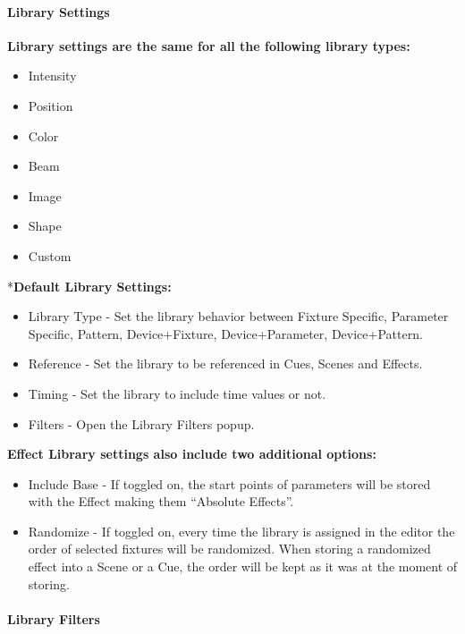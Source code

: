 \documentclass[
]{article}
\begin{document}
\hypertarget{library-settings}{%
\paragraph{Library Settings}\label{library-settings}}

\textbf{Library settings are the same for all the following library types:}

\begin{itemize}
\item
  Intensity
\item
  Position
\item
  Color
\item
  Beam
\item
  Image
\item
  Shape
\item
  Custom
\end{itemize}

*\textbf{Default Library Settings:}

\begin{itemize}
\item
  Library Type - Set the library behavior between Fixture Specific, Parameter Specific, Pattern, Device+Fixture, Device+Parameter, Device+Pattern.
\item
  Reference - Set the library to be referenced in Cues, Scenes and Effects.
\item
  Timing - Set the library to include time values or not.
\item
  Filters - Open the Library Filters popup.
\end{itemize}

\textbf{Effect Library settings also include two additional options:}

\begin{itemize}
\item
  Include Base - If toggled on, the start points of parameters will be stored with the Effect making them ``Absolute Effects''.
\item
  Randomize - If toggled on, every time the library is assigned in the editor the order of selected fixtures will be randomized. When storing a randomized effect into a Scene or a Cue, the order will be kept as it was at the moment of storing.
\end{itemize}

\hypertarget{library-filters}{%
\paragraph{Library Filters}\label{library-filters}}
\end{document}
